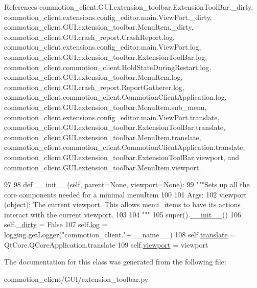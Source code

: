 References commotion\-\_\-client.\-G\-U\-I.\-extension\-\_\-toolbar.\-Extension\-Tool\-Bar.\-\_\-dirty, commotion\-\_\-client.\-extensions.\-config\-\_\-editor.\-main.\-View\-Port.\-\_\-dirty, commotion\-\_\-client.\-G\-U\-I.\-extension\-\_\-toolbar.\-Menu\-Item.\-\_\-dirty, commotion\-\_\-client.\-G\-U\-I.\-crash\-\_\-report.\-Crash\-Report.\-log, commotion\-\_\-client.\-extensions.\-config\-\_\-editor.\-main.\-View\-Port.\-log, commotion\-\_\-client.\-G\-U\-I.\-extension\-\_\-toolbar.\-Extension\-Tool\-Bar.\-log, commotion\-\_\-client.\-commotion\-\_\-client.\-Hold\-State\-During\-Restart.\-log, commotion\-\_\-client.\-G\-U\-I.\-extension\-\_\-toolbar.\-Menu\-Item.\-log, commotion\-\_\-client.\-G\-U\-I.\-crash\-\_\-report.\-Report\-Gatherer.\-log, commotion\-\_\-client.\-commotion\-\_\-client.\-Commotion\-Client\-Application.\-log, commotion\-\_\-client.\-G\-U\-I.\-extension\-\_\-toolbar.\-Menu\-Item.\-sub\-\_\-menu, commotion\-\_\-client.\-extensions.\-config\-\_\-editor.\-main.\-View\-Port.\-translate, commotion\-\_\-client.\-G\-U\-I.\-extension\-\_\-toolbar.\-Extension\-Tool\-Bar.\-translate, commotion\-\_\-client.\-G\-U\-I.\-extension\-\_\-toolbar.\-Menu\-Item.\-translate, commotion\-\_\-client.\-commotion\-\_\-client.\-Commotion\-Client\-Application.\-translate, commotion\-\_\-client.\-G\-U\-I.\-extension\-\_\-toolbar.\-Extension\-Tool\-Bar.\-viewport, and commotion\-\_\-client.\-G\-U\-I.\-extension\-\_\-toolbar.\-Menu\-Item.\-viewport.


\begin{DoxyCode}
97 
98     \textcolor{keyword}{def }\hyperlink{classcommotion__client_1_1GUI_1_1extension__toolbar_1_1MenuItem_a111f98709fa79a9be8bdeed5722a9b69}{\_\_init\_\_}(self, parent=None, viewport=None):
99         \textcolor{stringliteral}{"""Sets up all the core components needed for a minimal menuItem}
100 \textcolor{stringliteral}{        }
101 \textcolor{stringliteral}{        Args:}
102 \textcolor{stringliteral}{          viewport (object): The current viewport. This allows menu\_items to have its actions interact with
       the current viewport.}
103 \textcolor{stringliteral}{        }
104 \textcolor{stringliteral}{        """}
105         super().\hyperlink{classcommotion__client_1_1GUI_1_1extension__toolbar_1_1MenuItem_a111f98709fa79a9be8bdeed5722a9b69}{\_\_init\_\_}()
106         self.\hyperlink{classcommotion__client_1_1GUI_1_1extension__toolbar_1_1MenuItem_a3e3264241df55c41099f5f0f638d40f6}{\_dirty} = \textcolor{keyword}{False}
107         self.\hyperlink{classcommotion__client_1_1GUI_1_1extension__toolbar_1_1MenuItem_a6984ce2f476f256d285f1517d9beead6}{log} = logging.getLogger(\textcolor{stringliteral}{"commotion\_client."}+\_\_name\_\_)
108         self.\hyperlink{classcommotion__client_1_1GUI_1_1extension__toolbar_1_1MenuItem_a0134e71e4901cc4eec9b50785cba7265}{translate} = QtCore.QCoreApplication.translate
109         self.\hyperlink{classcommotion__client_1_1GUI_1_1extension__toolbar_1_1MenuItem_a49032d0bb2b22e07d66a228d756d9350}{viewport} = viewport
        
\end{DoxyCode}


The documentation for this class was generated from the following file\-:\begin{DoxyCompactItemize}
\item 
commotion\-\_\-client/\-G\-U\-I/extension\-\_\-toolbar.\-py\end{DoxyCompactItemize}
